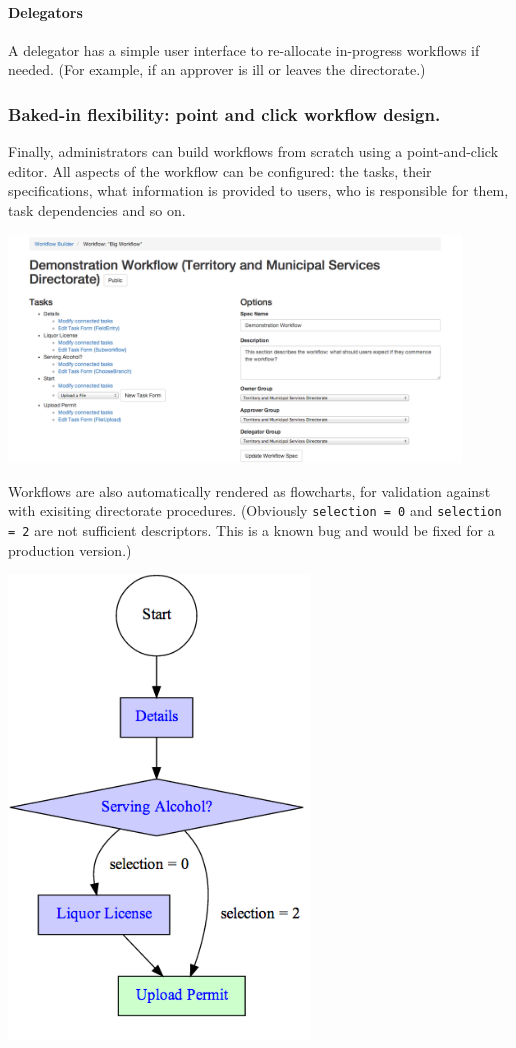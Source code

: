 \documentclass[12pt,a4paper,twosided]{article}
\begin{document}
\paragraph{Delegators}

A delegator has a simple user interface to re-allocate in-progress
workflows if needed. (For example, if an approver is ill or leaves the
directorate.)

\subsubsection{Baked-in flexibility: point and click workflow design.}

Finally, administrators can build workflows from scratch using a
point-and-click editor. All aspects of the workflow can be configured:
the tasks, their specifications, what information is provided to users,
who is responsible for them, task dependencies and so on.

\includegraphics[width=0.9\textwidth]{workflow-editor.png}

Workflows are also automatically rendered as flowcharts, for validation
against with exisiting directorate procedures. (Obviously
\texttt{selection = 0} and \texttt{selection = 2} are not sufficient
descriptors. This is a known bug and would be fixed for a production
version.)

\includegraphics[width=0.6\textwidth]{workflow.png}
\end{document}
